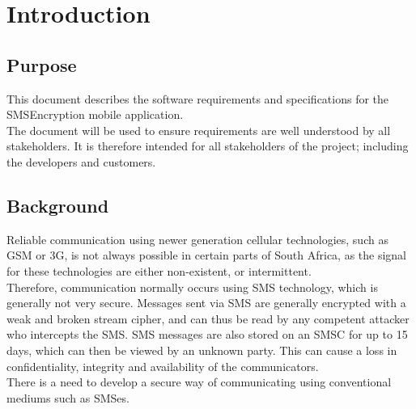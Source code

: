 \section{Introduction}

\subsection{Purpose}%
This document describes the software requirements and specifications for the SMSEncryption mobile application.
\vspace{10pt}\\
The document will be used to ensure requirements are well understood by all stakeholders. It is therefore intended for all stakeholders of the project; including the developers and customers.


\subsection{Background}
Reliable communication using newer generation cellular technologies, such as GSM or 3G, is not always possible in certain parts of South Africa, as the signal for these technologies are either non-existent, or intermittent.
\vspace{10pt}\\
Therefore, communication normally occurs using SMS technology, which is generally not very secure. Messages sent via SMS are generally encrypted with a weak and broken stream cipher, and can thus be read by any competent attacker who intercepts the SMS. SMS messages are also stored on an SMSC for up to 15 days, which can then be viewed by an unknown party. This can cause a loss in confidentiality, integrity and availability of the communicators.
\vspace{10pt}\\
There is a need to develop a secure way of communicating using conventional mediums such as SMSes.

